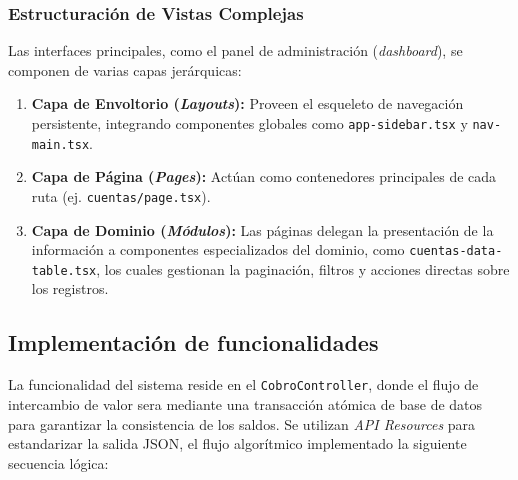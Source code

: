 \documentclass[12pt,letterpaper]{report}
\begin{document}
	
	
	\subsubsection{Estructuración de Vistas Complejas}
	Las interfaces principales, como el panel de administración (\textit{dash\-board}), se componen de varias capas jerárquicas:
	\begin{enumerate}
		\item \textbf{Capa de Envoltorio (\textit{Layouts}):} Proveen el esqueleto de navegación persistente, integrando componentes globales como \texttt{app-sidebar.tsx} y \texttt{nav-main.tsx}.
		\item \textbf{Capa de Página (\textit{Pages}):} Actúan como contenedores principales de cada ruta (ej. \texttt{cuentas/page.tsx}).
		\item \textbf{Capa de Dominio (\textit{Módulos}):} Las páginas delegan la presentación de la información a componentes especializados del dominio, como \texttt{cuentas-data-table.tsx}, los cuales gestionan la paginación, filtros y acciones directas sobre los registros.
	\end{enumerate}
	
	
	
	
	
	\subsection{Implementación de funcionalidades}
	
	La funcionalidad del sistema reside en el \texttt{CobroController}, donde el flujo de intercambio de valor sera mediante una transacción atómica de base de datos para garantizar la consistencia de los saldos. Se utilizan \textit{API Resources} para estandarizar la salida JSON, el flujo algorítmico implementado la siguiente secuencia lógica:
	
\end{document}
